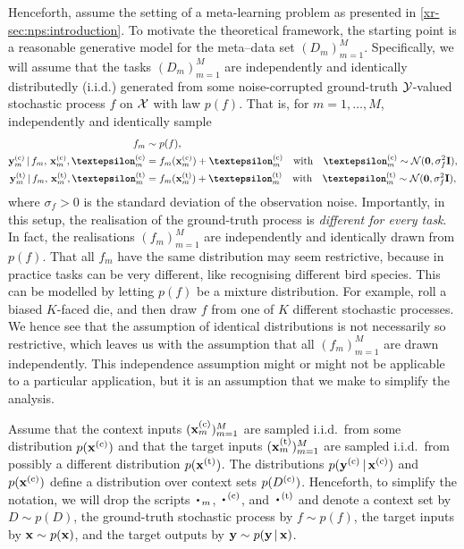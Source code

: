 \documentclass[12pt, twoside]{report}
\newcommand{\xrprefix}[1]{xr-#1}
\begin{document}
Henceforth, assume the setting of a meta-learning problem as presented in \cref{\xrprefix{sec:nps:introduction}}.
To motivate the theoretical framework, the starting point is a reasonable generative model for the meta--data set $(D_m)_{m=1}^M$.
Specifically, we will assume that the tasks $(D_m)_{m=1}^M$ are independently and identically distributedly (i.i.d.) generated from some noise-corrupted ground-truth $\mathcal{Y}$-valued stochastic process $f$ on $\mathcal{X}$ with law $p(f)$.
That is, for $m = 1, \ldots, M$, independently and identically sample
\begin{align}
    f_m &\sim p(f), \\
    \vy\us{(c)}_m \cond f_m,\, \vx\us{(c)}_m, \vep\us{(c)}_m &= f_m(\vx\us{(c)}_m) + \vep\us{(c)}_m
    \quad\text{with}\quad\vep\us{(c)}_m \sim \Normal(\vnull, \sigma^2_f \mI), \\
    \vy\us{(t)}_m \cond f_m,\, \vx\us{(t)}_m, \vep\us{(t)}_m &= f_m(\vx\us{(t)}_m) + \vep\us{(t)}_m
    \quad\text{with}\quad\vep\us{(t)}_m \sim \Normal(\vnull, \sigma^2_f \mI),
\end{align}
where $\sigma_f > 0$ is the standard deviation of the observation noise.
Importantly, in this setup, the realisation of the ground-truth process is \emph{different for every task}.
In fact, the realisations $(f_m)_{m=1}^M$ are independently and identically drawn from $p(f)$.
That all $f_m$ have the same distribution may seem restrictive, because in practice tasks can be very different, like recognising different bird species.
This can be modelled by letting $p(f)$ be a mixture distribution. 
For example, roll a biased $K$-faced die, and then draw $f$ from one of $K$ different stochastic processes.
We hence see that the assumption of identical distributions is not necessarily so restrictive,
which leaves us with the assumption that all $(f_m)_{m=1}^M$ are drawn independently.
This independence assumption might or might not be applicable to a particular application,
but it is an assumption that we make to simplify the analysis.

Assume that the context inputs $(\vx\us{(c)}_m)_{m=1}^M$ are sampled i.i.d.\ from some distribution $p(\vx\us{(c)})$ and that the target inputs $(\vx\us{(t)}_m)_{m=1}^M$ are sampled i.i.d.\ from possibly a different distribution $p(\vx\us{(t)})$.
The distributions $p(\vy\us{(c)} \cond \vx\us{(c)})$ and $p(\vx\us{(c)})$ define a distribution over context sets $p(D\us{(c)})$.
Henceforth, to simplify the notation, we will drop the scripts $\vardot_m$, $\vardot\us{(c)}$, and $\vardot\us{(t)}$ and denote a context set by $D \sim p(D)$, the ground-truth stochastic process by $f \sim p(f)$, the target inputs by $\mathbf{x} \sim p(\mathbf{x})$, and the target outputs by $\mathbf{y} \sim p(\mathbf{y} \,|\, \mathbf{x})$.
\end{document}
